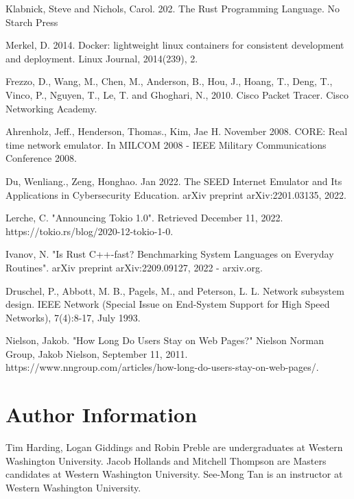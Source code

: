 \documentclass[journal]{IEEEtran} %
\begin{document}



\begin{thebibliography}{00}
     Klabnick, Steve and Nichols, Carol. 202. The Rust Programming Language. No Starch Press
    
     Merkel, D. 2014. Docker: lightweight linux containers for consistent development and deployment. Linux Journal, 2014(239), 2.
    
     Frezzo, D., Wang, M., Chen, M., Anderson, B., Hou, J., Hoang, T., Deng, T., Vinco, P., Nguyen, T., Le, T. and Ghoghari, N., 2010. Cisco Packet Tracer. Cisco Networking Academy.

     Ahrenholz, Jeff., Henderson, Thomas., Kim, Jae H. November 2008. CORE: Real time network emulator. In MILCOM 2008 - IEEE Military Communications Conference 2008. 

     Du, Wenliang., Zeng, Honghao. Jan 2022. The SEED Internet Emulator and Its Applications in Cybersecurity Education. arXiv preprint arXiv:2201.03135, 2022.

     Lerche, C. "Announcing Tokio 1.0". Retrieved December 11, 2022. https://tokio.rs/blog/2020-12-tokio-1-0.

     Ivanov, N. "Is Rust C++-fast? Benchmarking System Languages on Everyday Routines". arXiv preprint arXiv:2209.09127, 2022 - arxiv.org.

     Druschel, P., Abbott, M. B., Pagels, M., and Peterson, L. L. Network subsystem design. IEEE Network (Special Issue on End-System Support for High Speed Networks), 7(4):8-17, July 1993.

     Nielson, Jakob. "How Long Do Users Stay on Web Pages?" Nielson Norman Group, Jakob Nielson, September 11, 2011. https://www.nngroup.com/articles/how-long-do-users-stay-on-web-pages/.

\end{thebibliography}



\section{Author Information}
Tim Harding, Logan Giddings and Robin Preble are undergraduates at Western Washington University. Jacob Hollands and Mitchell Thompson are Masters candidates at Western Washington University. See-Mong Tan is an instructor at Western Washington University.
\end{document}
